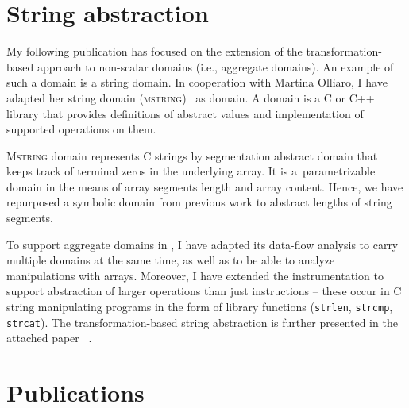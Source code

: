 \section{String abstraction}
\label{sec:string}

My following publication has focused on the extension of the
trans\-for\-ma\-tion-based approach to non-scalar domains (i.e., aggregate
domains).  An example of such a domain is a string domain. In cooperation with
Martina Olliaro, I have adapted her string domain
(\textsc{mstring})~\cite{Olliaro2018} as \lart domain. A \lart domain is a C or
C++ library that provides definitions of abstract values and implementation of
supported operations on them.

\textsc{Mstring} domain represents C strings by segmentation abstract domain
that keeps track of terminal zeros in the underlying array. It is
a~parametrizable domain in the means of array segments length and array
content.  Hence, we have repurposed a symbolic domain from previous work to
abstract lengths of string segments.

To support aggregate domains in \lart, I have adapted its data-flow analysis to
carry multiple domains at the same time, as well as to be able to analyze
manipulations with \llvm arrays. Moreover, I have extended the instrumentation
to support abstraction of larger operations than just \llvm instructions --
these occur in C string manipulating programs in the form of library functions
(\texttt{strlen}, \texttt{strcmp}, \texttt{strcat}). The transformation-based
string abstraction is further presented in the attached paper
~\cite{Lauko2019String}.

\section{Publications}
\label{sec:publications}

